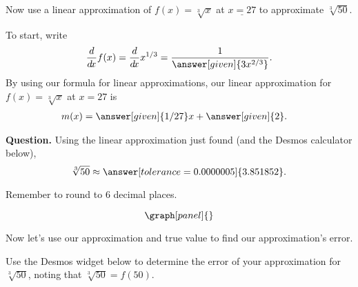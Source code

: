 \documentclass[handout,nooutcomes]{ximera}
\begin{document}
\begin{example}
Now use a linear approximation of $f(x) =\sqrt[3]{x}$ at $\underline{x=27}$ to
approximate $\sqrt[3]{50}$.
\begin{explanation}
To start, write
\[
\ddx f(x) = \ddx x^{1/3} = \frac{1}{\answer[given]{3x^{2/3}}}.
\]
By using our formula for linear approximations, our linear 
approximation for $f(x)=\sqrt[3]{x}$ at $x=27$ is
\begin{align*}
m(x) &= \answer[given]{1/27}x + \answer[given]{2}.
\end{align*}


\textbf{Question. } Using the linear approximation just found (and the Desmos calculator below),
\[
\sqrt[3]{50} \approx \answer[tolerance=0.0000005]{3.851852}.
\]
\begin{expandable}
Remember to round to 6 decimal places.
\end{expandable}

\[
\graph[panel]{}
\]




\begin{image}
\end{image}

Now let's use our approximation and true value to find our approximation's error.

Use the Desmos widget below to determine the error of your approximation for $\sqrt[3]{50}$, noting that $\sqrt[3]{50} = f(50)$.


\end{explanation}
\end{example}
\end{document}
